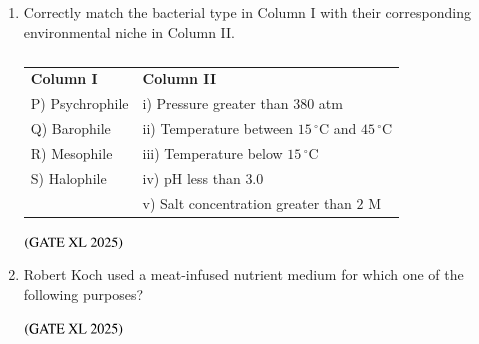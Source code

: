 \documentclass[journal]{IEEEtran}
\begin{document}
\begin{enumerate}
    \item Correctly match the bacterial type in Column I with their corresponding environmental niche in Column II.

    \begin{table}[H]
        \centering
        \begin{tabular}{ll}
            \textbf{Column I} & \textbf{Column II} \\
            P) Psychrophile & i) Pressure greater than $380$ atm \\
            Q) Barophile & ii) Temperature between $15\,^{\circ}\text{C}$ and $45\,^{\circ}\text{C}$ \\
            R) Mesophile & iii) Temperature below $15\,^{\circ}\text{C}$ \\
            S) Halophile & iv) pH less than $3.0$ \\
             & v) Salt concentration greater than $2$ M \\
        \end{tabular}
        \caption*{}
        \label{tab:xl2025_q68}
    \end{table}

    \hfill $\left(\text{GATE XL 2025}\right)$
    \begin{enumerate}
    \end{enumerate}

    \item Robert Koch used a meat-infused nutrient medium for which one of the following purposes?

    \hfill $\left(\text{GATE XL 2025}\right)$
    \begin{enumerate}
    \end{enumerate}


\end{enumerate}
\end{document}
